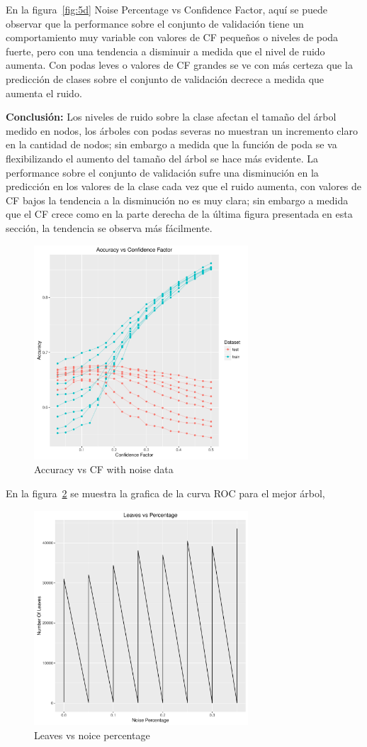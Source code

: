 En la figura~\ref{fig:5d} Noise Percentage vs Confidence Factor,
aquí se puede observar que la performance sobre el conjunto de validación tiene un
comportamiento muy variable con valores de CF pequeños o niveles de poda fuerte, pero
con una tendencia a disminuir a medida que el nivel de ruido aumenta. Con podas leves
o valores de CF grandes se ve con más certeza que la predicción de clases sobre el
conjunto de validación decrece a medida que aumenta el ruido.

\textbf{Conclusión:} Los niveles de ruido sobre la clase afectan el tamaño del árbol medido en
nodos, los árboles con podas severas no muestran un incremento claro en la cantidad de
nodos; sin embargo a medida que la función de poda se va flexibilizando el aumento del
tamaño del árbol se hace más evidente.
La performance sobre el conjunto de validación sufre una disminución en la predicción en
los valores de la clase cada vez que el ruido aumenta, con valores de CF bajos la
tendencia a la disminución no es muy clara; sin embargo a medida que el CF crece como
en la parte derecha de la última figura presentada en esta sección, la tendencia se
observa más fácilmente.

\begin{figure}
  \centering
  \includegraphics[width = 8cm]{5a.pdf}
  \caption{Accuracy vs CF with noise data}
  \label{fig:5a}
\end{figure}

En la figura~\ref{fig:5b} se muestra la grafica de la curva ROC para el mejor árbol,

\begin{figure}
  \centering
  \includegraphics[width = 8cm]{5b.pdf}
  \caption{Leaves vs noice percentage}
  \label{fig:5b}
\end{figure}

